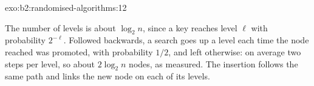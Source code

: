 \begin{solution}{exo:b2:randomised-algorithms:12}


The number of levels is about $\log_2 n$, since a key reaches level $\ell$ with probability $2^{-\ell}$. Followed
backwards, a search goes up a level each time the node reached was promoted, with probability $1/2$, and left
otherwise: on average two steps per level, so about $2 \log_2 n$ nodes, as measured. The insertion follows the same path
and links the new node on each of its levels.
\end{solution}

